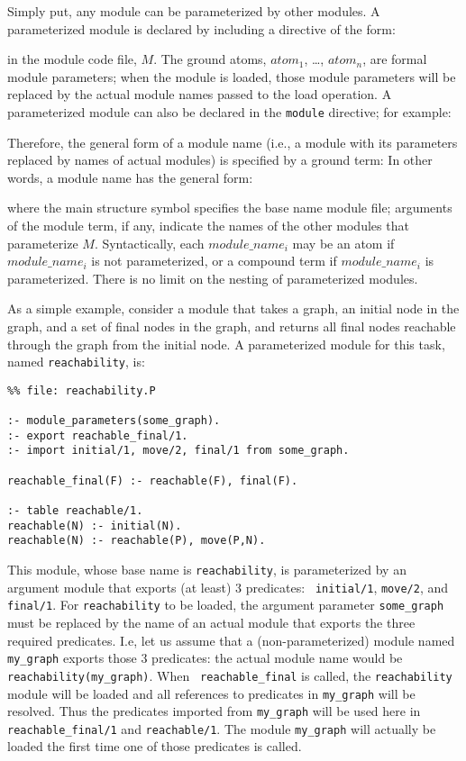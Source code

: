 Simply put, any module can be parameterized by other modules.  A
parameterized module is declared by including a directive of the form:


\noindent in the module code file, $M$.  The ground atoms, $atom_1$,
\ldots, $atom_n$, are formal module parameters; when the module is
loaded, those module parameters will be replaced by the actual module
names passed to the load operation.  A parameterized module can also
be declared in the {\tt module} directive; for example:


Therefore, the general form of a module name (i.e., a module with its
parameters replaced by names of actual modules) is specified by a
ground term: In other words, a module name has the general form:


\noindent
where the main structure symbol specifies the base name module file;
arguments of the module term, if any, indicate the names of the other
modules that parameterize $M$.  Syntactically, each $module\_name_i$
may be an atom if $module\_name_i$ is not parameterized, or a compound
term if $module\_name_i$ is parameterized.  There is no limit on the
nesting of parameterized modules.

As a simple example, consider a module that takes a graph, an initial
node in the graph, and a set of final nodes in the graph, and returns
all final nodes reachable through the graph from the initial node.  A
parameterized module for this task, named {\tt reachability}, is:
\begin{verbatim}
%% file: reachability.P

:- module_parameters(some_graph).
:- export reachable_final/1.
:- import initial/1, move/2, final/1 from some_graph.

reachable_final(F) :- reachable(F), final(F).

:- table reachable/1.
reachable(N) :- initial(N).
reachable(N) :- reachable(P), move(P,N).
\end{verbatim}
This module, whose base name is {\tt reachability}, is parameterized
by an argument module that exports (at least) 3 predicates: {\tt
  initial/1}, {\tt move/2}, and {\tt final/1}.  For {\tt reachability}
to be loaded, the argument parameter {\tt some\_graph} must be
replaced by the name of an actual module that exports the three
required predicates.  I.e, let us assume that a (non-parameterized)
module named {\tt my\_graph} exports those 3 predicates: the actual
module name would be {\tt reachability(my\_graph)}.  When {\tt
  reachable\_final} is called, the {\tt reachability} module will be
loaded and all references to predicates in {\tt my\_graph} will be
resolved.  Thus the predicates imported from {\tt my\_graph} will be
used here in {\tt reachable\_final/1} and {\tt reachable/1}.  The
module {\tt my\_graph} will actually be loaded the first time one of
those predicates is called.

